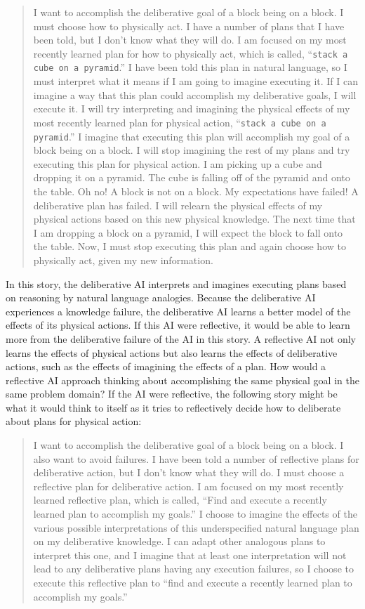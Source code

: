 \begin{quote}
  I want to accomplish the deliberative goal of a block being on a
  block.  I must choose how to physically act.  I have a number of
  plans that I have been told, but I don't know what they will do.  I
  am focused on my most recently learned plan for how to physically
  act, which is called, ``{\tt{stack a cube on a pyramid}}.''  I have
  been told this plan in natural language, so I must interpret what it
  means if I am going to imagine executing it.  If I can imagine a way
  that this plan could accomplish my deliberative goals, I will
  execute it.  I will try interpreting and imagining the physical
  effects of my most recently learned plan for physical action,
  ``{\tt{stack a cube on a pyramid}}.''  I imagine that executing this
  plan will accomplish my goal of a block being on a block.  I will
  stop imagining the rest of my plans and try executing this plan for
  physical action.  I am picking up a cube and dropping it on a
  pyramid.  The cube is falling off of the pyramid and onto the table.
  Oh no!  A block is not on a block.  My expectations have failed!  A
  deliberative plan has failed.  I will relearn the physical effects
  of my physical actions based on this new physical knowledge.  The
  next time that I am dropping a block on a pyramid, I will expect the
  block to fall onto the table.  Now, I must stop executing this plan
  and again choose how to physically act, given my new information.
\end{quote}
In this story, the deliberative AI interprets and imagines executing
plans based on reasoning by natural language analogies.  Because the
deliberative AI experiences a knowledge failure, the deliberative AI
learns a better model of the effects of its physical actions.  If this
AI were reflective, it would be able to learn more from the
deliberative failure of the AI in this story.  A reflective AI not
only learns the effects of physical actions but also learns the
effects of deliberative actions, such as the effects of imagining the
effects of a plan.  How would a reflective AI approach thinking about
accomplishing the same physical goal in the same problem domain?  If
the AI were reflective, the following story might be what it would
think to itself as it tries to reflectively decide how to deliberate
about plans for physical action:
\begin{quote}
  I want to accomplish the deliberative goal of a block being on a
  block.  I also want to avoid failures.  I have been told a number of
  reflective plans for deliberative action, but I don't know what they
  will do.  I must choose a reflective plan for deliberative action.
  I am focused on my most recently learned reflective plan, which is
  called, ``Find and execute a recently learned plan to accomplish my
  goals.''  I choose to imagine the effects of the various possible
  interpretations of this underspecified natural language plan on my
  deliberative knowledge.  I can adapt other analogous plans to
  interpret this one, and I imagine that at least one interpretation
  will not lead to any deliberative plans having any execution
  failures, so I choose to execute this reflective plan to ``find and
  execute a recently learned plan to accomplish my goals.''
\end{quote}

